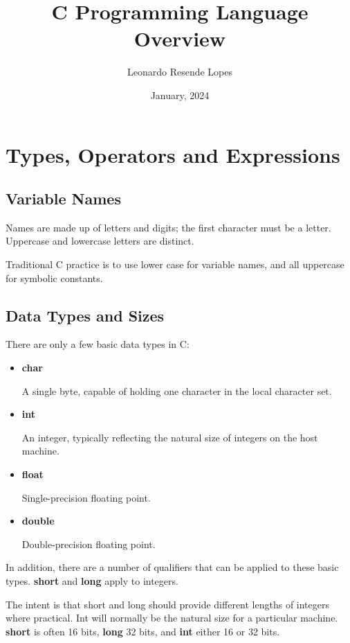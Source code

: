 \documentclass{article}
\title{C Programming Language Overview}
\author{Leonardo Resende Lopes}
\date{January, 2024}
\begin{document}
\maketitle
\clearpage

\section{Types, Operators and Expressions}

\subsection{Variable Names}

Names are made up of letters and digits; the first character must be a letter.
Uppercase and lowercase letters are distinct. 

Traditional C practice is to use lower case for variable names, and all uppercase for symbolic constants.

\subsection{Data Types and Sizes}

There are only a few basic data types in C:

\begin{itemize}

\item \textbf{char}

	A single byte, capable of holding one character in the local character set.

\item \textbf{int}

	An integer, typically reflecting the natural size of integers on the host machine.

\item \textbf{float}

	Single-precision floating point.

\item \textbf{double}

	Double-precision floating point.
\end{itemize}


In addition, there are a number of qualifiers that can be applied to these basic types. \textbf{short} and \textbf{long} apply to integers.

The intent is that short and long should provide different lengths of integers where practical. Int will normally be the natural size for a particular machine. \textbf{short} is often 16 bits, \textbf{long} 32 bits, and \textbf{int} either 16 or 32 bits.
\end{document}
